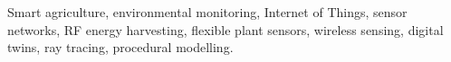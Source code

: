 \documentclass[conference]{IEEEtran}
\begin{document}
\begin{IEEEkeywords}
Smart agriculture, environmental monitoring, Internet of Things, sensor networks, RF energy harvesting, flexible plant sensors, wireless sensing, digital twins, ray tracing, procedural modelling.
\end{IEEEkeywords}











\balance



\printbibliography%
\end{document}

